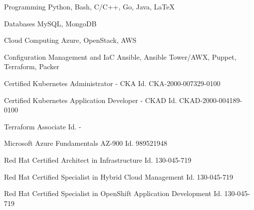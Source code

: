
\begin{cvskills}

  \cvskill
    {Programming} %
    {Python, Bash, C/C++, Go, Java, LaTeX} %

  \cvskill
    {Databases} %
    {MySQL, MongoDB} %

  \cvskill
    {Cloud Computing} %
    {Azure, OpenStack, AWS} %

  \cvskill
    {Configuration Management and IaC} %
    {Ansible, Ansible Tower/AWX, Puppet, Terraform, Packer} %

  \cvskill
    {Certified Kubernetes Administrator - CKA} %
    {Id. CKA-2000-007329-0100 } %

  \cvskill
    {Certified Kubernetes Application Developer - CKAD} %
    {Id. CKAD-2000-004189-0100 } %

  \cvskill
    {Terraform Associate} %
    {Id. - } %

  \cvskill
    {Microsoft Azure Fundamentals AZ-900} %
    {Id. 989521948 } %

  \cvskill
    {Red Hat Certified Architect in Infrastructure} %
    {Id. 130-045-719} %

  \cvskill
    {Red Hat Certified Specialist in Hybrid Cloud Management} %
    {Id. 130-045-719} %

  \cvskill
    {Red Hat Certified Specialist in OpenShift Application Development} %
    {Id. 130-045-719} %


\end{cvskills}
